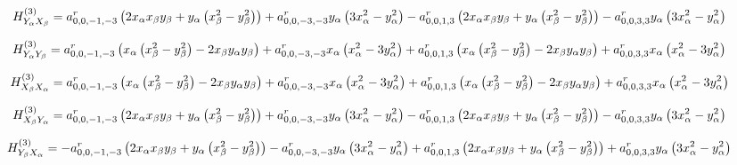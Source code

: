 \documentclass[fleqn]{article}
\begin{document}
\begin{dmath*}
H_{Y_{\alpha}X_{\beta}}^{(3)}= a^{r}_{0,0,-1,-3} \left(2 x_{\alpha} x_{\beta} y_{\beta} + y_{\alpha} \left(x_{\beta}^{2} - y_{\beta}^{2}\right)\right) +  a^{r}_{0,0,-3,-3} y_{\alpha} \left(3 x_{\alpha}^{2} - y_{\alpha}^{2}\right) -  a^{r}_{0,0,1,3} \left(2 x_{\alpha} x_{\beta} y_{\beta} + y_{\alpha} \left(x_{\beta}^{2} - y_{\beta}^{2}\right)\right) -  a^{r}_{0,0,3,3} y_{\alpha} \left(3 x_{\alpha}^{2} - y_{\alpha}^{2}\right)\\
\end{dmath*}

\begin{dmath*}
H_{Y_{\alpha}Y_{\beta}}^{(3)}= a^{r}_{0,0,-1,-3} \left(x_{\alpha} \left(x_{\beta}^{2} - y_{\beta}^{2}\right) - 2 x_{\beta} y_{\alpha} y_{\beta}\right) +  a^{r}_{0,0,-3,-3} x_{\alpha} \left(x_{\alpha}^{2} - 3 y_{\alpha}^{2}\right) +  a^{r}_{0,0,1,3} \left(x_{\alpha} \left(x_{\beta}^{2} - y_{\beta}^{2}\right) - 2 x_{\beta} y_{\alpha} y_{\beta}\right) +  a^{r}_{0,0,3,3} x_{\alpha} \left(x_{\alpha}^{2} - 3 y_{\alpha}^{2}\right)\\
\end{dmath*}

\begin{dmath*}
H_{X_{\beta}X_{\alpha}}^{(3)}=a^{r}_{0,0,-1,-3} \left(x_{\alpha} \left(x_{\beta}^{2} - y_{\beta}^{2}\right) - 2 x_{\beta} y_{\alpha} y_{\beta}\right) + a^{r}_{0,0,-3,-3} x_{\alpha} \left(x_{\alpha}^{2} - 3 y_{\alpha}^{2}\right) + a^{r}_{0,0,1,3} \left(x_{\alpha} \left(x_{\beta}^{2} - y_{\beta}^{2}\right) - 2 x_{\beta} y_{\alpha} y_{\beta}\right) + a^{r}_{0,0,3,3} x_{\alpha} \left(x_{\alpha}^{2} - 3 y_{\alpha}^{2}\right)\\
\end{dmath*}

\begin{dmath*}
H_{X_{\beta}Y_{\alpha}}^{(3)}= a^{r}_{0,0,-1,-3} \left(2 x_{\alpha} x_{\beta} y_{\beta} + y_{\alpha} \left(x_{\beta}^{2} - y_{\beta}^{2}\right)\right) +  a^{r}_{0,0,-3,-3} y_{\alpha} \left(3 x_{\alpha}^{2} - y_{\alpha}^{2}\right) -  a^{r}_{0,0,1,3} \left(2 x_{\alpha} x_{\beta} y_{\beta} + y_{\alpha} \left(x_{\beta}^{2} - y_{\beta}^{2}\right)\right) -  a^{r}_{0,0,3,3} y_{\alpha} \left(3 x_{\alpha}^{2} - y_{\alpha}^{2}\right)\\
\end{dmath*}

\begin{dmath*}
H_{Y_{\beta}X_{\alpha}}^{(3)}=-  a^{r}_{0,0,-1,-3} \left(2 x_{\alpha} x_{\beta} y_{\beta} + y_{\alpha} \left(x_{\beta}^{2} - y_{\beta}^{2}\right)\right) -  a^{r}_{0,0,-3,-3} y_{\alpha} \left(3 x_{\alpha}^{2} - y_{\alpha}^{2}\right) +  a^{r}_{0,0,1,3} \left(2 x_{\alpha} x_{\beta} y_{\beta} + y_{\alpha} \left(x_{\beta}^{2} - y_{\beta}^{2}\right)\right) +  a^{r}_{0,0,3,3} y_{\alpha} \left(3 x_{\alpha}^{2} - y_{\alpha}^{2}\right)\\
\end{dmath*}
\end{document}
